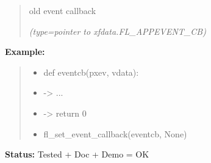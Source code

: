\begin{boxedminipage}{\funcwidth}
      \begin{quote}
      old event callback

      {\it (type=pointer to xfdata.FL\_APPEVENT\_CB)}

      \end{quote}

\textbf{Example:}
\begin{quote}
  \begin{itemize}

  \item
    \setlength{\parskip}{0.6ex}
def eventcb(pxev, vdata):



  \item {\textbar}-{\textgreater}{\textbar} ...



  \item {\textbar}-{\textgreater}{\textbar} return 0



  \item fl\_set\_event\_callback(eventcb, None)



\end{itemize}

\end{quote}

\textbf{Status:} Tested + Doc + Demo = OK



    \end{boxedminipage}

    \label{xformslib:flxbasic:fl_set_idle_callback}

    \vspace{0.5ex}

